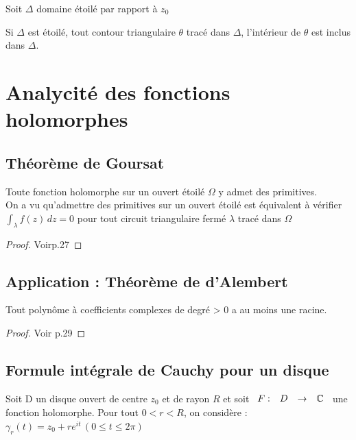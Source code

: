 \documentclass[]{report}
\begin{document}
Soit $\Delta$ domaine étoilé par rapport à $z_0$

\begin{prop}
    Si $\Delta$ est étoilé, tout contour triangulaire $\theta$ tracé dans $\Delta$, l'intérieur de $\theta$ est inclus dans $\Delta$.
\end{prop}

\chapter{Analycité des fonctions holomorphes}

\section{Théorème de Goursat}

\begin{tm}
    Toute fonction holomorphe sur un ouvert étoilé $\Omega$ y admet des primitives.\\
    On a vu qu'admettre des primitives sur un ouvert étoilé est équivalent à vérifier $\displaystyle{\int_\lambda f(z)\,dz=0}$ pour tout circuit triangulaire fermé $\lambda$ tracé dans $\Omega$
\end{tm}

\begin{proof}
    Voirp.27
\end{proof}

\section{Application : Théorème de d'Alembert}

\begin{tm}
    Tout polynôme à coefficients complexes de degré > 0 a au moins une racine.
\end{tm}

\begin{proof}
    Voir p.29
\end{proof}

\section{Formule intégrale de Cauchy pour un disque}

Soit D un disque ouvert de centre $z_0$ et de rayon $R$ et soit $\begin{array}{ccccc}
F : & D & \to & \mathbb{C}
\end{array}$ une fonction holomorphe. Pour tout $0<r<R$, on considère : $\gamma_r(t)=z_0+re^{it}\,(0\le t\le 2\pi)$
\end{document}
